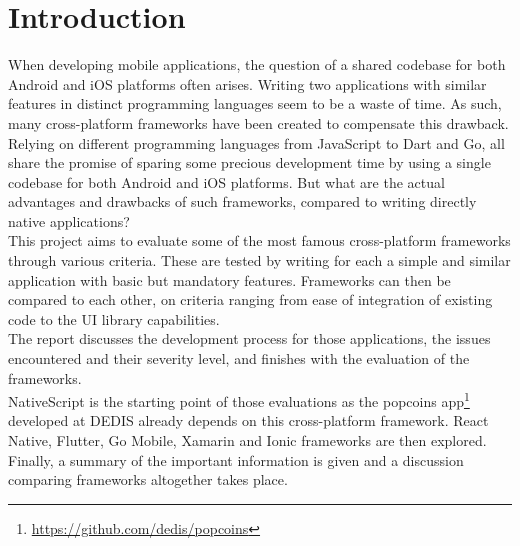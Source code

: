 \section{Introduction}


\hspace{\parindent} When developing mobile applications, the question of a shared codebase for both Android and iOS platforms often arises. Writing two applications with similar features in distinct programming languages seem to be a waste of time. As such, many cross-platform frameworks have been created to compensate this drawback. Relying on different programming languages from JavaScript to Dart and Go, all share the promise of sparing some precious development time by using a single codebase for both Android and iOS platforms. But what are the actual advantages and drawbacks of such frameworks, compared to writing directly native applications? \\

This project aims to evaluate some of the most famous cross-platform frameworks through various criteria. These are tested by writing for each a simple and similar application with basic but mandatory features. Frameworks can then be compared to each other, on criteria ranging from ease of integration of existing code to the UI library capabilities.\\
The report discusses the development process for those applications, the issues encountered and their severity level, and finishes with the evaluation of the frameworks.\\
NativeScript is the starting point of those evaluations as the popcoins app\footnote{\url{https://github.com/dedis/popcoins}} developed at DEDIS already depends on this cross-platform framework. React Native, Flutter, Go Mobile, Xamarin and Ionic frameworks are then explored. Finally, a summary of the important information is given and a discussion comparing frameworks altogether takes place.